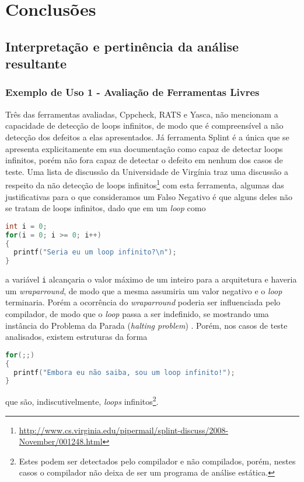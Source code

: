 \chapter{Conclusões}\label{conclusoes}

\section{Interpretação e pertinência da análise resultante}

\subsection{Exemplo de Uso 1 - Avaliação de Ferramentas Livres}

Três das ferramentas avaliadas, Cppcheck, RATS e Yasca, não mencionam a capacidade de detecção de loops infinitos, de modo que é compreensível a não detecção dos defeitos a elas apresentados.  Já ferramenta Splint é a única que se apresenta explicitamente em sua documentação como capaz de detectar loops infinitos, porém não fora capaz de detectar o defeito em nenhum dos casos de teste. Uma lista de discussão da Universidade de Virgínia traz uma discussão a respeito da não detecção de loops infinitos\footnote{\url{http://www.cs.virginia.edu/pipermail/splint-discuss/2008-November/001248.html}} com esta ferramenta, algumas das justificativas para o que consideramos um Falso Negativo é que alguns deles não se tratam de loops infinitos, dado que em um \textit{loop} como
\begin{lstlisting}[language=C]
int i = 0;
for(i = 0; i >= 0; i++)
{
  printf("Seria eu um loop infinito?\n");
}
\end{lstlisting}
a variável \lstinline{i} alcançaria o valor máximo de um inteiro para a arquitetura e haveria um \textit{wraparround}, de modo que a mesma assumiria um valor negativo e o \textit{loop} terminaria. Porém a ocorrência do \textit{wraparround} poderia ser influenciada pelo compilador, de modo que o \textit{loop} passa a ser indefinido, se mostrando uma instância do Problema da Parada (\textit{halting problem}) \cite{turing}. Porém, nos casos de teste analisados, existem estruturas da forma
\begin{lstlisting}[language=C]
for(;;)
{
  printf("Embora eu não saiba, sou um loop infinito!");
}
\end{lstlisting}
que são, indiscutivelmente, \textit{loops} infinitos\footnote{Estes podem ser detectados pelo compilador e não compilados, porém, nestes casos o compilador não deixa de ser um programa de análise estática.}.

